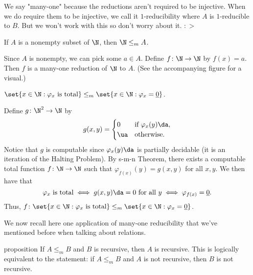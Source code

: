 \documentclass[class=article, crop=false]{standalone}
\begin{document}
\begin{rem}
  We say "many-one" because the reductions aren't required to be injective. When we do require them to be injective, we call it $1$-reducibility where $A$ is $1$-reducible to $B$. But we won't work with this so don't worry about it. $\colon >$
\end{rem}

\begin{ex}
  If $A$ is a nonempty subset of $\N$, then $\N \leq_m A$.

  \begin{pf}
    Since $A$ is nonempty, we can pick some $a \in A$. Define $f\colon \N \to \N$ by $f(x) = a$. Then $f$ is a many-one reduction of $\N$ to $A$. (See the accompanying figure for a visual.)
  \end{pf}

  \begin{center}
  \end{center}
\end{ex}


\begin{ex}
  $\set{x \in \N : \varphi_x \text{ is total}} \leq_m \set{x \in \N : \varphi_x = \underline 0}$.

  \begin{pf}
    Define $g\colon \N^2 \to \N$ by
      \[
        g(x,y) =
          \begin{cases}
            0 & \text{if } \varphi_x(y) \da, \\
            \ua & \text{otherwise}.
          \end{cases}
      \]
    Notice that $g$ is computable since $\varphi_x(y)\da$ is partially decidable (it is an iteration of the Halting Problem). By s-m-n Theorem, there exists a computable total function $f\colon \N \to \N$ such that $\varphi_{f(x)}(y) = g(x,y)$ for all $x,y$. We then have that
      \[
        \varphi_x \text{ is total} \iff g(x,y) \da=0 \text{ for all } y \iff \varphi_{f(x)} = \underline 0.
      \]
    Thus, $f\colon \set{x \in \N : \varphi_x \text{ is total}} \leq_m \set{x \in \N : \varphi_x = \underline 0}$.
  \end{pf}
\end{ex}

We now recall  here one application of many-one reducibility that we've mentioned before when talking about relations.

\begin{result}{proposition}
  If $A \leq_m B$ and $B$ is recursive, then $A$ is recursive. This is logically equivalent to the statement: if $A\leq_m B$ and $A$ is not recursive, then $B$ is not recursive.
\end{result}
\end{document}
